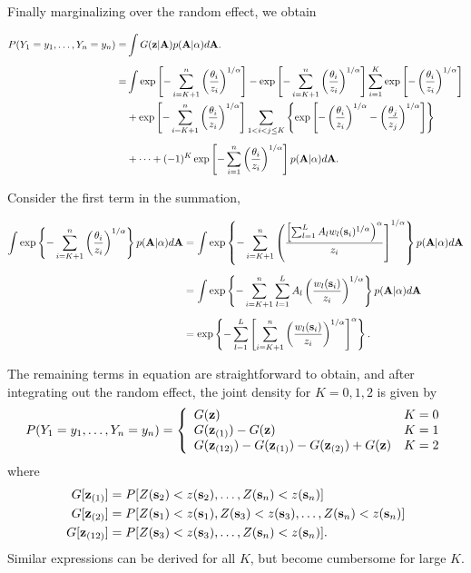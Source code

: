 \documentclass[11pt]{article}
\begin{document}
Finally marginalizing over the random effect, we obtain

\begin{align} \label{rbeq:joint}
    P(Y_1=y_1,\ldots,Y_n=y_n) =&\int G(\mbox{\bf z} | \mbox{\bf A}) p( \mbox{\bf A} | \alpha) d\mbox{\bf A}. \nonumber\\[0.5em]
			=& \int \exp \left[ -\sum_{ i = K+1}^{ n }\left( \frac{ \theta_i }{ z_i } \right)^{1/\alpha} \right] - \exp \left[ -\sum_{ i = K+1}^{ n }\left( \frac{ \theta_i }{ z_i } \right)^{1/\alpha} \right] \sum_{ i = 1}^{K} \exp\left[ -\left( \frac{ \theta_i }{ z_i } \right)^{ 1/\alpha} \right] \nonumber\\
		&  + \exp \left[ -\sum_{ i = K+1}^{ n }\left( \frac{ \theta_i }{ z_i } \right)^{1/\alpha} \right] \sum_{ 1 < i < j \le K } \left\{ \exp \left[ - \left( \frac{ \theta_i }{ z_i } \right)^{ 1/\alpha} - \left( \frac{ \theta_j }{ z_j } \right)^{ 1/\alpha } \right] \right \} \nonumber \\[0.5em]
		& + \cdots + (-1)^K \exp\left[ - \sum_{ i = 1 }^{ n }\left( \frac{ \theta_i }{ z_i } \right)^{ 1/\alpha} \right] p( \mbox{\bf A} | \alpha) d\mbox{\bf A}.
\end{align}

Consider the first term in the summation,

\begin{align}
	\int \exp \left\{ -\sum_{ i = K+1}^{ n }\left( \frac{ \theta_i }{ z_i } \right)^{1/\alpha} \right\} p( \mbox{\bf A} | \alpha) d\mbox{\bf A} &= \int \exp \left\{ - \sum_{ i = K + 1 }^n \left( \frac{ \left[ \sum_{ l = 1 }^L  A_l w_{l}(\mbox{\bf s}_i)^{1/\alpha} \right)^\alpha }{ z_i} \right]^{ 1/\alpha } \right \} p( \mbox{\bf A} | \alpha) d\mbox{\bf A} \nonumber \\[0.5em]
	 &= \int \exp \left\{ -\sum_{ i = K + 1}^n \sum_{ l = 1}^L A_l \left( \frac{ w_l (\mbox{\bf s}_i) }{ z_i } \right)^{1/\alpha} \right \} p( \mbox{\bf A} | \alpha) d\mbox{\bf A} \nonumber \\[0.5em]
	 &=\exp\left\{-\sum_{ l = 1}^L \left[ \sum_{ i = K + 1 }^n \left( \frac{ w_l(\mbox{\bf s}_i)}{ z_i} \right)^{1/\alpha} \right]^\alpha \right\}.
\end{align}

The remaining terms in equation  are straightforward to obtain, and after integrating out the random effect, the joint density for $K = 0, 1, 2$ is given by
\begin{align}\label{rbeq:pmf}
  P(Y_1=y_1,\ldots,Y_n=y_n) =  \left\{
    \begin{array}{ll}
      G(\mbox{\bf z}) & K=0 \\
      G(\mbox{\bf z}_{(1)})-G(\mbox{\bf z}) & K=1 \\
      G(\mbox{\bf z}_{(12)})-G(\mbox{\bf z}_{(1)})-G(\mbox{\bf z}_{(2)})+G(\mbox{\bf z}) & K=2
    \end{array}
  \right.
\end{align}
where
\begin{align*}
  G[\mbox{\bf z}_{(1)}] &= P[Z(\mbox{\bf s}_2)<z(\mbox{\bf s}_2),\ldots,Z(\mbox{\bf s}_n)<z(\mbox{\bf s}_n)] \\
  G[\mbox{\bf z}_{(2)}] &= P[Z(\mbox{\bf s}_1)<z(\mbox{\bf s}_1),Z(\mbox{\bf s}_3)<z(\mbox{\bf s}_3),\ldots,Z(\mbox{\bf s}_n)<z(\mbox{\bf s}_n)]\\
  G[\mbox{\bf z}_{(12)}] &= P[Z(\mbox{\bf s}_3)<z(\mbox{\bf s}_3),\ldots,Z(\mbox{\bf s}_n)<z(\mbox{\bf s}_n)].
\end{align*}
Similar expressions can be derived for all $K$, but become cumbersome for large $K$.
\end{document}
